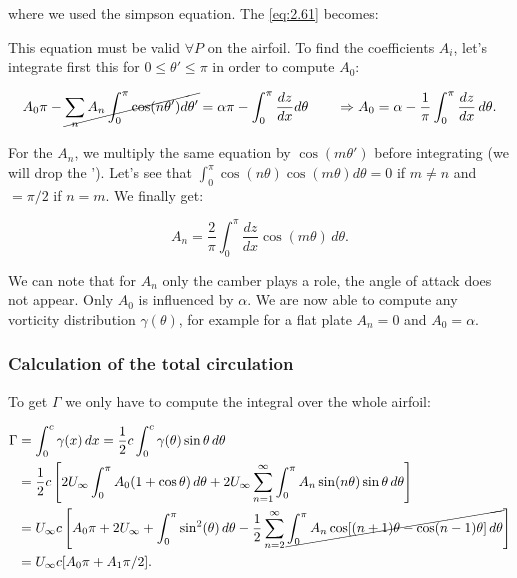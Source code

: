 	where we used the simpson equation. The \eqref{eq:2.61} becomes: 
	
	\begin{center}
	\end{center}
	
	This equation must be valid $\forall P$ on the airfoil. To find the coefficients $A_i$, let's integrate first this for $0\leq \theta ' \leq \pi$ in order to compute $A_0$: 
	
	\begin{equation}
	A_0\pi - \cancel{\sum _n A_n \int _0 ^\pi \cos (n\theta ')d\theta '} = \alpha\pi - \int _0 ^\pi \frac{dz}{dx}d\theta\qquad \Rightarrow A_0 = \alpha - \frac{1}{\pi} \int _0^\pi \frac{dz}{dx}\, d\theta.
	\end{equation}
	
	For the $A_n$, we multiply the same equation by $\cos (m\theta ')$ before integrating (we will drop the '). Let's see that $\int _0 ^\pi \cos (n\theta)\cos (m\theta) d\theta = 0$ if $ m \neq n $ and $= \pi /2$ if $n = m$. We finally get:
	
	\begin{equation}
	A_n = \frac{2}{\pi} \int _0 ^\pi \frac{dz}{dx} \cos (m\theta) \, d\theta .
	\end{equation}
	
	We can note that for $A_n$ only the camber plays a role, the angle of attack does not appear. Only $A_0$ is influenced by $\alpha$. We are now able to compute any vorticity distribution $\gamma (\theta)$, for example for a flat plate $A_n = 0$ and $A_0 = \alpha$. 
	
\subsubsection{Calculation of the total circulation}
	To get $\Gamma$ we only have to compute the integral over the whole airfoil:
	
	\begin{equation}
	\begin{aligned}
	\Gamma &= \int _0 ^c \gamma (x) \, dx = \frac{1}{2} c \int _0 ^c \gamma (\theta ) \sin \theta \, d\theta \\
	& = \frac{1}{2} c \left[ 2U_\infty \int _0 ^\pi A_0 (1+\cos\theta) \, d\theta + 2U_\infty \sum _{n=1}^\infty \int _0^\pi A_n \sin (n\theta)\sin \theta \, d\theta  \right] \\
	&= U_\infty  c \left[  A_0 \pi  + 2U_\infty + \int _0^\pi \sin ^2(\theta) \, d\theta - \frac{1}{2} \sum _{n=2}^\infty \cancel{\int _0^\pi A_n \cos [(n+1)\theta - \cos (n-1)\theta ] \, d\theta } \right] \\
	&= U_\infty c [A_0 \pi + A_1 \pi /2].
	\end{aligned}
	\end{equation}
	
